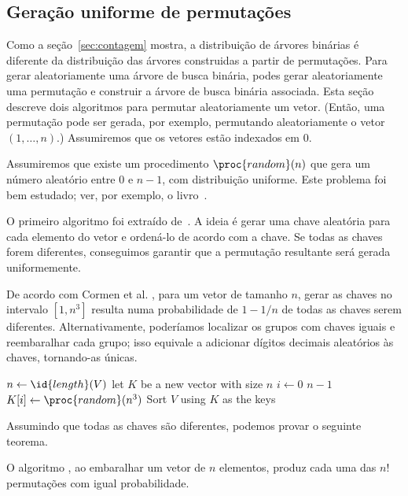 \subsection{Geração uniforme de permutações}

Como a seção~\ref{sec:contagem} mostra,
a distribuição de árvores binárias é diferente
da distribuição das árvores construidas a partir de permutações.
Para gerar aleatoriamente uma árvore de busca binária,
podes gerar aleatoriamente uma permutação
e construir a árvore de busca binária associada.
Esta seção descreve dois algoritmos para permutar aleatoriamente um vetor.
(Então, uma permutação pode ser gerada, por exemplo,
permutando aleatoriamente o vetor $(1, \dots, n)$.)
Assumiremos que os vetores estão indexados em $0$.

Assumiremos que existe um procedimento $\proc{random}(n)$
que gera um número aleatório entre $0$ e $n-1$, com distribuição uniforme.
Este problema foi bem estudado; ver, por exemplo, o livro~\cite{Knuth1997}.

O primeiro algoritmo foi extraído de~\cite[p.125]{CormenLeisersonRivestStein2009}.
A ideia é gerar uma chave aleatória para cada elemento do vetor
e ordená-lo de acordo com a chave.
Se todas as chaves forem diferentes,
conseguimos garantir que a permutação resultante será gerada uniformemente.

De acordo com Cormen et al. \cite[p.~125]{CormenLeisersonRivestStein2009},
para um vetor de tamanho $n$,
gerar as chaves no intervalo $[1, n^3]$ resulta numa probabilidade de $1-1/n$
de todas as chaves serem diferentes.
Alternativamente, poderíamos localizar os grupos com chaves iguais
e reembaralhar cada grupo;
isso equivale a adicionar dígitos decimais aleatórios às chaves,
tornando-as únicas.

\begin{codebox}
    \li $n \gets \id{length}(V)$
    \li let $K$ be a new vector with size $n$
    \li \For $i \gets 0$ \To $n-1$
    \li \Do
            $K[i] \gets \proc{random}(n^3)$
    \End
    \li Sort $V$ using $K$ as the keys
\end{codebox}

Assumindo que todas as chaves são diferentes, podemos provar o seguinte teorema.

\begin{proposition}
    O algoritmo ,
    ao embaralhar um vetor de $n$ elementos,
    produz cada uma das $n!$ permutações
    com igual probabilidade.
\end{proposition}

